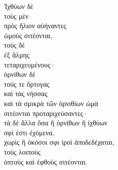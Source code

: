 
{\large
\begin{greek}
\noindent Ἰχθύων δὲ \\
\tabto{2em} τοὺς μὲν \\
\tabto{4em} πρὸς ἥλιον αὐήναντες \\
\tabto{2em} ὠμοὺς σιτέονται,\\
\tabto{2em} τοὺς δὲ \\
\tabto{4em} ἐξ ἅλμης \\
\tabto{2em} τεταριχευμένους·\\
ὀρνίθων δὲ \\
\tabto{2em} τούς τε ὄρτυγας \\
\tabto{2em} καὶ τὰς νήσσας \\
\tabto{2em} καὶ τὰ σμικρὰ τῶν ὀρνιθίων ὠμὰ \\
σιτέονται προταριχεύσαντες·\\
τὰ δὲ ἄλλα ὅσα ἢ ὀρνίθων ἢ ἰχθύων \\
\tabto{2em} σφί ἐστι ἐχόμενα,\\
χωρὶς ἢ ὁκόσοι σφι ἱροὶ ἀποδεδέχαται,\\
τοὺς λοιποὺς \\
\tabto{2em} ὀπτοὺς καὶ ἑφθοὺς σιτέονται.\\

\end{greek}
}

